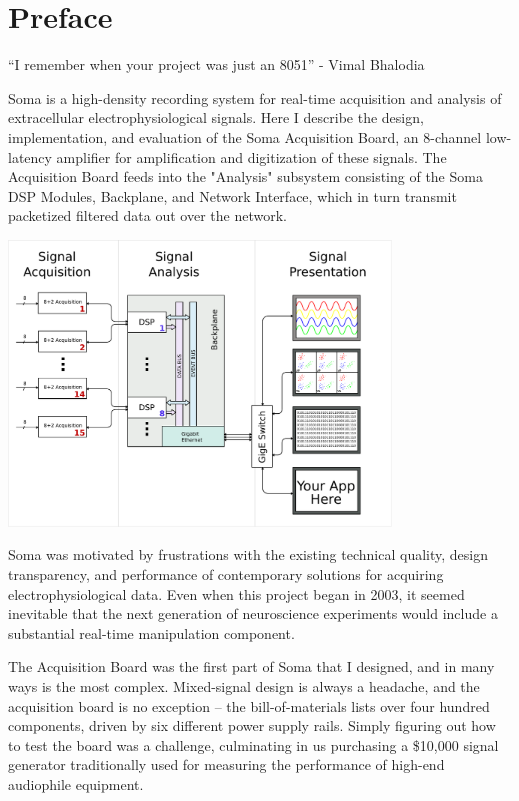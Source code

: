 \chapter*{Preface}

\begin{flushright}
``I remember when your project was just an 8051'' - Vimal Bhalodia
\end{flushright}

\vspace{0.8in}

Soma is a high-density recording system for real-time acquisition and
analysis of extracellular electrophysiological signals. Here I describe
the design, implementation, and evaluation of the Soma Acquisition Board, 
an 8-channel low-latency amplifier for amplification and digitization
of these signals. The Acquisition Board feeds into the "Analysis" subsystem
consisting of the Soma DSP Modules, Backplane, and Network Interface,
which in turn transmit packetized filtered data out over the network. 

\begin{center}
\includegraphics[width=4in]{arch.pdf}
\end{center}

Soma was motivated by frustrations with the existing technical
quality, design transparency, and performance of contemporary
solutions for acquiring electrophysiological data. Even when this
project began in 2003, it seemed inevitable that the next generation
of neuroscience experiments would include a substantial real-time
manipulation component.

The Acquisition Board was the first part of Soma that I designed, and
in many ways is the most complex. Mixed-signal design is always a
headache, and the acquisition board is no exception -- the
bill-of-materials lists over four hundred components, driven by six
different power supply rails.  Simply figuring out how to test the
board was a challenge, culminating in us purchasing a \$10,000 signal
generator traditionally used for measuring the performance of high-end
audiophile equipment.


